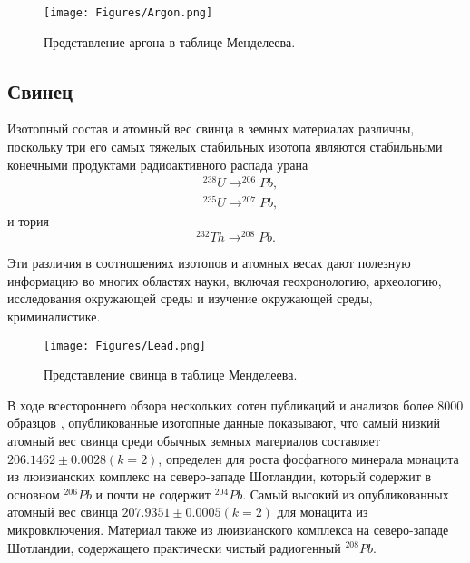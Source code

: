 \documentclass[a5paper,openany]{book}
\begin{document}
\begin{figure}[ht] 
	\centering\small
	\texttt{[image: Figures/Argon.png]}
	\caption{Представление аргона в таблице Менделеева.} 
	\label{f:Argon}
\end{figure}


\subsection{Свинец} \label{s:Lead}

Изотопный состав и атомный вес свинца в земных материалах различны, поскольку три его самых тяжелых стабильных изотопа являются стабильными конечными продуктами радиоактивного распада урана 
\begin{align}
& ^{238}U \longrightarrow ^{206}Pb,  \\ 
& ^{235}U \longrightarrow ^{207}Pb, 
\end{align}
и тория 
\begin{equation}
^{232}Th \longrightarrow ^{208}Pb.
\end{equation}

Эти различия в соотношениях изотопов и атомных весах дают полезную информацию во многих областях науки, включая геохронологию, археологию, исследования окружающей среды и изучение окружающей среды, криминалистике.

\begin{figure}[ht] 
	\centering\small
	\texttt{[image: Figures/Lead.png]}
	\caption{Представление свинца в таблице Менделеева.} 
	\label{f:Lead}
\end{figure}

В ходе всестороннего обзора нескольких сотен публикаций и анализов более 8000 образцов \cite{IUPACLead},
опубликованные изотопные данные показывают, что самый низкий атомный вес свинца среди обычных земных материалов составляет
$206.1462\pm 0.0028 (k = 2)$,
определен для роста фосфатного минерала монацита из люизианских
комплекс на северо-западе Шотландии, который содержит в основном $^{206}Pb$ и почти не содержит $^{204}Pb$. Самый высокий из опубликованных
атомный вес свинца $207.9351 \pm 0.0005 (k = 2)$ для монацита из микровключения. Материал также
из люизианского комплекса на северо-западе Шотландии, содержащего практически чистый радиогенный $^{208}Pb$. 
\end{document}
